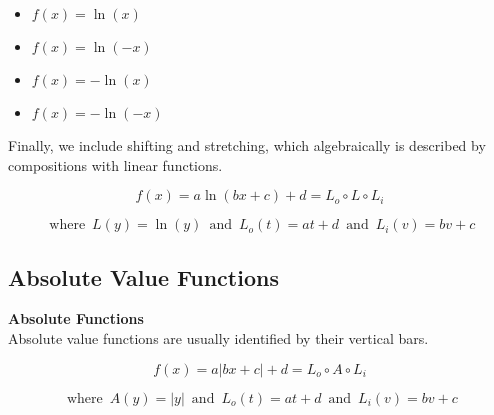 \documentclass{ximera}
\begin{document}
\begin{template}
\begin{itemize}
\item $f(x) = \ln(x)$ 
\item $f(x) = \ln(-x)$ 
\item $f(x) = -\ln(x)$ 
\item $f(x) = -\ln(-x)$ 
\end{itemize}






Finally, we include shifting and stretching, which algebraically is described by compositions with linear functions.


\[ f(x) = a \ln(b x + c) + d = L_o \circ L \circ L_i\]

\[
\text{ where } \,   L(y) = \ln(y)   \,  \text{ and } \,    L_o(t) = a t + d    \,  \text{ and } \,   L_i(v) = b v + c
\]








\end{template}





















\subsection{Absolute Value Functions}








\begin{template}  \textbf{\textcolor{blue!55!black}{Absolute Functions}} \\



Absolute value functions are usually identified by their vertical bars.





\[ f(x) = a | b x + c | + d = L_o \circ A \circ L_i\]

\[
\text{ where } \,  A(y) = | y |  \,  \text{ and } \,    L_o(t) = a t + d    \,  \text{ and } \,   L_i(v) = b v + c
\]







\end{template}
\end{document}
